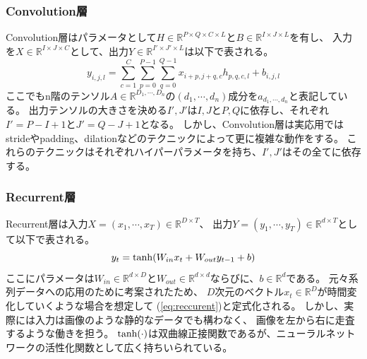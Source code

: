 \subsubsection{\rm Convolution\mc 層}
Convolution層はパラメータとして\(H \in \mathbb R^{P\times Q\times C\times L}\)と\(B \in \mathbb R^{I\times J\times L}\)を有し、
入力を\(X \in \mathbb R^{I\times J\times C}\)として、出力\(Y \in \mathbb R^{I'\times J'\times L}\)は以下で表される。
\begin{equation}
    y_{i,j,l} = \sum_{c=1}^C \sum_{p=0}^{P-1} \sum_{q=0}^{Q-1}x_{i+p,j+q,c}h_{p,q,c,l}+b_{i,j,l}
    \label{eq:convlayer}
\end{equation}
ここでもn階のテンソル\(A\in \mathbb R^{D_1,\cdots ,D_n}\)の\((d_1,\cdots,d_n)\)成分を\(a_{d_1,\cdots,d_n}\)と表記している。
出力テンソルの大きさを決める\(I',J'\)は\(I,J\)と\(P,Q\)に依存し、それぞれ\(I'=P-I+1\)と\(J'=Q-J+1\)となる。
しかし、Convolution層は実応用ではstrideやpadding、dilationなどのテクニックによって更に複雑な動作をする。
これらのテクニックはそれぞれハイパーパラメータを持ち、\(I',J'\)はその全てに依存する。

\subsubsection{\rm Recurrent\mc 層}
Recurrent層は入力\(X = (x_1,\cdots,x_T)\in \mathbb R^{D \times T}\)、
出力\(Y = (y_1,\cdots,y_T)\in \mathbb R^{d \times T}\)として以下で表される。
\begin{equation}
    y_t = {\rm tanh}(W_{in}x_t + W_{out}y_{t-1} + b) 
    \label{eq:reccurent}
\end{equation}
ここにパラメータは\(W_{in} \in \mathbb R^{d \times D}\)と\(W_{out} \in \mathbb R^{d \times d}\)ならびに、\(b \in \mathbb R^d \)である。
元々系列データへの応用のために考案されたため、
\(D\)次元のベクトル\(x_t \in \mathbb R^D\)が時間変化していくような場合を想定して
(\ref{eq:reccurent})と定式化される。
しかし、実際には入力は画像のような静的なデータでも構わなく、
画像を左から右に走査するような働きを担う。
\(\rm tanh(\cdot)\)は双曲線正接関数であるが、ニューラルネットワークの活性化関数として広く持ちいられている。


